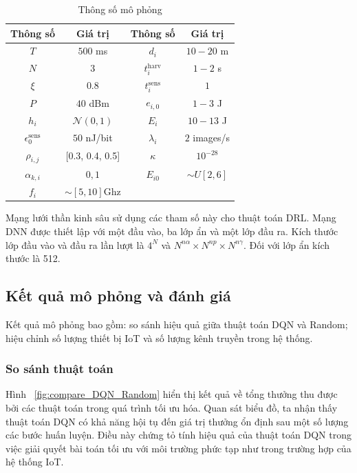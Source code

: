 \documentclass{article} %
\begin{document}
\begin{table}[htbp!]
    \centering
    \caption{Thông số mô phỏng}
    \begin{tabular}{|c|c|c|c|}
    \hline
    Thông số & Giá trị & Thông số & Giá trị\\
    \hline
    $T$ & $500$ ms & $d_i$ & $10-20$ m \\
    ${N}$& 3 &  $t_i^{\mathrm{harv}}$& $1-2$ s \\
    $\xi$ & $0.8$ &
    $t_i^{\mathrm{sens}}$ & $1$ \\
    $P$ & $40$ dBm & $e_{i,0}$ & $1-3$ J\\
    $h_i$ & $\mathcal{N}\left(0,1\right)$ & $E_i$ & $10-13$ J\\
    $\epsilon_0^{\mathrm{sens}}$ & $50$ nJ/bit & $\lambda_i$ & $2$ images/s\\
    $\rho_{i,j}$ & [0.3, 0.4, 0.5] & $\kappa$ & ${10}^{-28}$\\
    $\alpha_{k,i}$ & ${0, 1}$ & $E_{i0}$ & $\sim U\left[2,6\right]$\\
    $f_i$ & $\sim\left[5,10\right]$Ghz& &\\
    \hline
    \end{tabular}
    \label{Table:parameter}
\end{table}

Mạng lưới thần kinh sâu sử dụng các tham số này cho thuật toán DRL. Mạng DNN được thiết lập với một đầu vào, ba lớp ẩn và một lớp đầu ra. Kích thước lớp đầu vào và đầu ra lần lượt là $4^N$ và $N^{n\alpha} \times N^{np} \times N^{n\gamma}$. Đối với lớp ẩn kích thước là 512.

\subsection{Kết quả mô phỏng và đánh giá}
    Kết quả mô phỏng bao gồm: so sánh hiệu quả giữa thuật toán DQN và Random; hiệu chỉnh số lượng thiết bị IoT và số lượng kênh truyền trong hệ thống.
\subsubsection{So sánh thuật toán}
Hình ~\ref{fig:compare_DQN_Random} hiển thị kết quả về tổng thưởng thu được bởi các thuật toán trong quá trình tối ưu hóa. Quan sát biểu đồ, ta nhận thấy thuật toán DQN có khả năng hội tụ đến giá trị thưởng ổn định sau một số lượng các bước huấn luyện. Điều này chứng tỏ tính hiệu quả của thuật toán DQN trong việc giải quyết bài toán tối ưu với môi trường phức tạp như trong trường hợp của hệ thống IoT.
\end{document}
